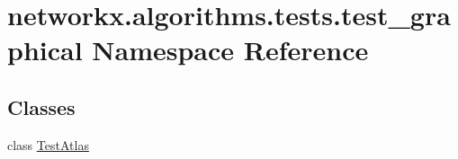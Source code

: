 \hypertarget{namespacenetworkx_1_1algorithms_1_1tests_1_1test__graphical}{}\section{networkx.\+algorithms.\+tests.\+test\+\_\+graphical Namespace Reference}
\label{namespacenetworkx_1_1algorithms_1_1tests_1_1test__graphical}
\subsection*{Classes}
\begin{DoxyCompactItemize}
\item 
class \hyperlink{classnetworkx_1_1algorithms_1_1tests_1_1test__graphical_1_1TestAtlas}{Test\+Atlas}
\end{DoxyCompactItemize}
